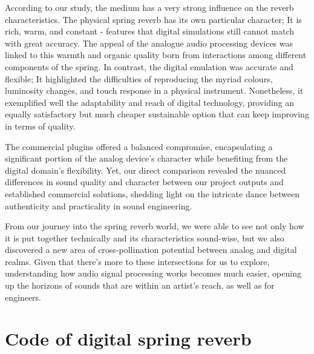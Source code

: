 \documentclass[12pt]{article}
\begin{document}
According to our study, the medium has a very strong influence on the reverb characteristics. The physical spring reverb has its own particular character; It is rich, warm, and constant - features that digital simulations still cannot match with great accuracy. The appeal of the analogue audio processing devices was linked to this warmth and organic quality born from interactions among different components of the spring. In contrast, the digital emulation was accurate and flexible; It highlighted the difficulties of reproducing the myriad colours, luminosity changes, and touch response in a physical instrument. Nonetheless, it exemplified well the adaptability and reach of digital technology, providing an equally satisfactory but much cheaper sustainable option that can keep improving in terms of quality.

The commercial plugins offered a balanced compromise, encapsulating a significant portion of the analog device's character while benefiting from the digital domain's flexibility. Yet, our direct comparison revealed the nuanced differences in sound quality and character between our project outputs and established commercial solutions, shedding light on the intricate dance between authenticity and practicality in sound engineering.

From our journey into the spring reverb world, we were able to see not only how it is put together technically and its characteristics sound-wise, but we also discovered a new area of cross-pollination potential between analog and digital realms. Given that there's more to these intersections for us to explore, understanding how audio signal processing works becomes much easier, opening up the horizons of sounds that are within an artist's reach, as well as for engineers.

\newpage
\appendix


\addappheadtotoc

\section{Code of digital spring reverb}
\end{document}
